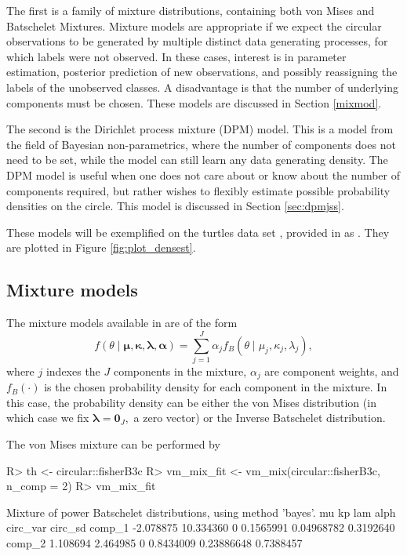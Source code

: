 The first is a family of mixture distributions, containing both von
Mises and Batschelet Mixtures. Mixture models are appropriate if we
expect the circular observations to be generated by multiple distinct
data generating processes, for which labels were not observed. In these
cases, interest is in parameter estimation, posterior prediction of new
observations, and possibly reassigning the labels of the unobserved
classes. A disadvantage is that the number of underlying components must
be chosen. These models are discussed in Section \ref{mixmod}.

The second is the Dirichlet process mixture (DPM) model. This is a model
from the field of Bayesian non-parametrics, where the number of
components does not need to be set, while the model can still learn any
data generating density. The DPM model is useful when one does not care
about or know about the number of components required, but rather wishes
to flexibly estimate possible probability densities on the circle. This
model is discussed in Section \ref{sec:dpmjss}.

These models will be exemplified on the turtles data set
\citep{stephens1969techniques, fisher1995statistical}, provided in
 as . They are plotted in Figure
\ref{fig:plot_densest}.

\hypertarget{mixture-models}{%
\subsection{Mixture models}\label{mixture-models}}

\label{mixmod}

The mixture models available in  are of the form
\begin{equation}
 f(\theta \mid \boldsymbol{\mu}, \boldsymbol{\kappa}, \boldsymbol{\lambda}, \boldsymbol{\alpha}) = \sum_{j = 1}^J\alpha_j f_B(\theta \mid \mu_j, \kappa_j, \lambda_j),
\end{equation} where \(j\) indexes the \(J\) components in the mixture,
\(\alpha_j\) are component weights, and \(f_B(\cdot)\) is the chosen
probability density for each component in the mixture. In this case, the
probability density can be either the von Mises distribution (in which
case we fix \(\boldsymbol{\lambda}= \boldsymbol{0}_J,\) a zero vector)
or the Inverse Batschelet distribution.

The von Mises mixture can be performed by

\begin{CodeChunk}

\begin{CodeInput}
R> th <- circular::fisherB3c
R> vm_mix_fit <- vm_mix(circular::fisherB3c, n_comp = 2)
R> vm_mix_fit
\end{CodeInput}

\begin{CodeOutput}
Mixture of power Batschelet distributions, using method 'bayes'.
              mu        kp lam      alph   circ_var   circ_sd
comp_1 -2.078875 10.334360   0 0.1565991 0.04968782 0.3192640
comp_2  1.108694  2.464985   0 0.8434009 0.23886648 0.7388457
\end{CodeOutput}
\end{CodeChunk}

